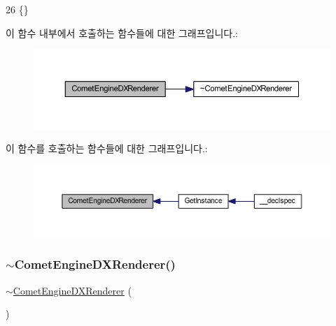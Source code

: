 \begin{DoxyCode}
26 \{\}
\end{DoxyCode}
이 함수 내부에서 호출하는 함수들에 대한 그래프입니다.\+:\nopagebreak
\begin{figure}[H]
\begin{center}
\leavevmode
\includegraphics[width=350pt]{class_comet_engine_1_1_renderer_1_1_comet_engine_d_x_renderer_a5d4d4453042540bd1f4e4a36229b62f6_cgraph}
\end{center}
\end{figure}
이 함수를 호출하는 함수들에 대한 그래프입니다.\+:\nopagebreak
\begin{figure}[H]
\begin{center}
\leavevmode
\includegraphics[width=350pt]{class_comet_engine_1_1_renderer_1_1_comet_engine_d_x_renderer_a5d4d4453042540bd1f4e4a36229b62f6_icgraph}
\end{center}
\end{figure}
\mbox{\label{class_comet_engine_1_1_renderer_1_1_comet_engine_d_x_renderer_a7ec2ab41325dc127a1780c88d84a81e2}} 
\subsubsection{\texorpdfstring{$\sim$\+Comet\+Engine\+D\+X\+Renderer()}{~CometEngineDXRenderer()}}
{\footnotesize\ttfamily $\sim$\hyperlink{class_comet_engine_1_1_renderer_1_1_comet_engine_d_x_renderer}{Comet\+Engine\+D\+X\+Renderer} (\begin{DoxyParamCaption}{ }\end{DoxyParamCaption})\hspace{0.3cm}{\ttfamily [private]}}



